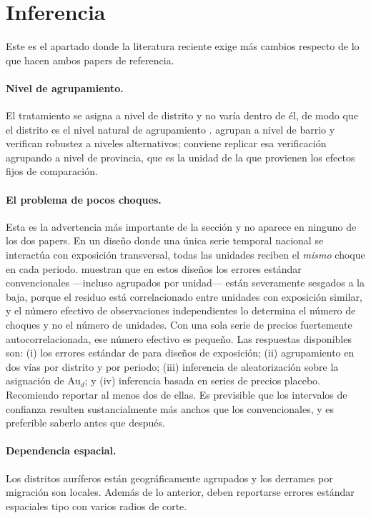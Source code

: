 \documentclass[11pt,a4paper]{article}
\newcommand{\Au}{\mathrm{Au}}
\begin{document}
\section{Inferencia}

Este es el apartado donde la literatura reciente exige más cambios respecto de lo que hacen ambos papers de referencia.

\paragraph{Nivel de agrupamiento.} El tratamiento se asigna a nivel de distrito y no varía dentro de él, de modo que el distrito es el nivel natural de agrupamiento \citep{abadie2023}. \citet{braakmann2024} agrupan a nivel de barrio y verifican robustez a niveles alternativos; conviene replicar esa verificación agrupando a nivel de provincia, que es la unidad de la que provienen los efectos fijos de comparación.

\paragraph{El problema de pocos choques.} Esta es la advertencia más importante de la sección y no aparece en ninguno de los dos papers. En un diseño donde una única serie temporal nacional se interactúa con exposición transversal, todas las unidades reciben el \emph{mismo} choque en cada periodo. \citet{adao2019} muestran que en estos diseños los errores estándar convencionales ---incluso agrupados por unidad--- están severamente sesgados a la baja, porque el residuo está correlacionado entre unidades con exposición similar, y el número efectivo de observaciones independientes lo determina el número de choques y no el número de unidades. Con una sola serie de precios fuertemente autocorrelacionada, ese número efectivo es pequeño. Las respuestas disponibles son: (i) los errores estándar de \citet{adao2019} para diseños de exposición; (ii) agrupamiento en dos vías por distrito y por periodo; (iii) inferencia de aleatorización sobre la asignación de $\Au_d$; y (iv) inferencia basada en series de precios placebo. Recomiendo reportar al menos dos de ellas. Es previsible que los intervalos de confianza resulten sustancialmente más anchos que los convencionales, y es preferible saberlo antes que después.

\paragraph{Dependencia espacial.} Los distritos auríferos están geográficamente agrupados y los derrames por migración son locales. Además de lo anterior, deben reportarse errores estándar espaciales tipo \citet{conley1999} con varios radios de corte.
\end{document}
